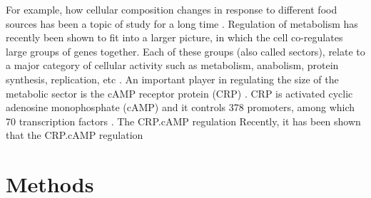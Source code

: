 For example, how cellular composition changes in response to different food sources has been a topic of study for a long time \cite{Schaechter1958}.
%
Regulation of metabolism has recently been shown to fit into a larger picture, in which the cell co-regulates large groups of genes together.
Each of these groups (also called sectors), relate to a major 
%
category of cellular activity such as 
metabolism, anabolism, protein synthesis, replication, etc 
\cite{Klumpp2009, You2013, Scott2014, Hui2015, Hermsen2015, Erickson2017}.
%
%
An important player in regulating the size of the metabolic sector is the cAMP receptor protein (CRP) \cite{Keseler2017, Grainger2005, Robinson1998, Zheng2004, Gorke2008, Fic2009, Green2014}.
%
CRP is activated cyclic adenosine monophosphate (cAMP) and it controls 378 promoters, among which 70 transcription factors \cite{Green2014, Shimada2011}.
%
The CRP.cAMP regulation 
%
Recently, it has been shown that the CRP.cAMP regulation 

%
% 



\section*{Methods}



